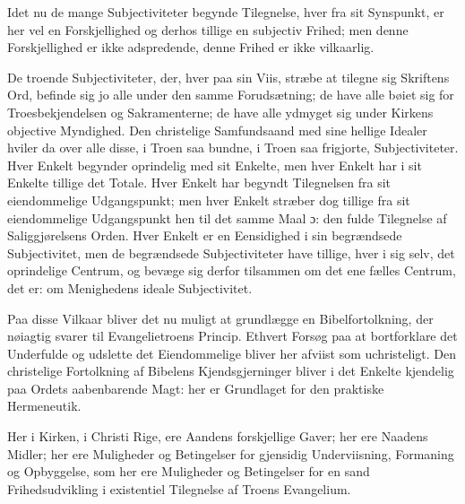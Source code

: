 \documentclass[12pt,a4paper]{book}
\newcommand{\opage}[1]{\marginnote{\footnotesize\textit{[#1]}}}
\begin{document}
Idet nu de mange Subjectiviteter begynde Tilegnelse, hver fra sit Synspunkt, er
her vel en Forskjellighed og derhos tillige en subjectiv Frihed; men denne
Forskjellighed er ikke adspredende, denne Frihed er ikke vilkaarlig.

De troende Subjectiviteter, der, hver paa sin Viis, stræbe at tilegne sig
Skriftens Ord, befinde sig jo alle under den samme Forudsætning; de have alle
bøiet sig for Troesbekjendelsen og Sakramenterne; de have alle ydmyget sig under
Kirkens objective Myndighed. Den christelige Samfundsaand med sine hellige
Idealer hviler da over alle disse, i Troen saa bundne, i Troen saa frigjorte,
Subjectiviteter. Hver Enkelt begynder oprindelig
\opage{156} med sit Enkelte, men hver Enkelt har i sit Enkelte tillige det Totale. Hver
Enkelt har begyndt Tilegnelsen fra sit eiendommelige Udgangspunkt; men hver
Enkelt stræber dog tillige fra sit eiendommelige Udgangspunkt hen til det samme
Maal ɔ: den fulde Tilegnelse af Saliggjørelsens Orden. Hver Enkelt er en
Eensidighed i sin begrændsede Subjectivitet, men de begrændsede Subjectiviteter
have tillige, hver i sig selv, det oprindelige Centrum, og bevæge sig derfor
tilsammen om det ene fælles Centrum, det er: om Menighedens ideale
Subjectivitet.

Paa disse Vilkaar bliver det nu muligt at grundlægge en Bibelfortolkning, der
nøiagtig svarer til Evangelietroens Princip. Ethvert Forsøg paa at bortforklare
det Underfulde og udslette det Eiendommelige bliver her afviist som uchristeligt.
Den christelige Fortolkning af Bibelens Kjendsgjerninger bliver i det Enkelte
kjendelig paa Ordets aabenbarende Magt: her er Grundlaget for den praktiske
Hermeneutik.

Her i Kirken, i Christi Rige, ere Aandens forskjellige Gaver; her ere Naadens
Midler; her ere Muligheder og Betingelser for gjensidig Underviisning, Formaning
og Opbyggelse, som her ere Muligheder og Betingelser for en sand
Frihedsudvikling i existentiel Tilegnelse af Troens Evangelium.
\end{document}
